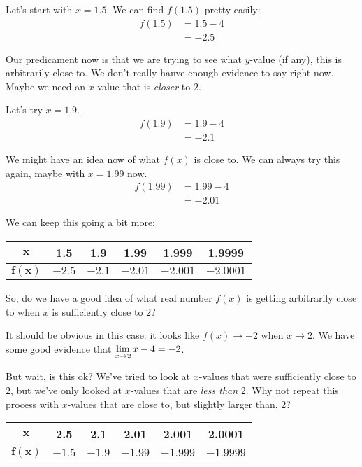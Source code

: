 Let's start with $x=1.5$.
We can find $f(1.5)$ pretty easily:
\begin{align*}
  f(1.5) & = 1.5-4\\
  & = -2.5
\end{align*}

Our predicament now is that we are trying to see what $y$-value (if any), this is arbitrarily close to.
We don't really hanve enough evidence to say right now.
Maybe we need an $x$-value that is \textit{closer} to $2$.

Let's try $x=1.9$.
\begin{align*}
  f(1.9) & = 1.9-4\\
  & = -2.1
\end{align*}

We might have an idea now of what $f(x)$ is close to.
We can always try this again, maybe with $x=1.99$ now.
\begin{align*}
  f(1.99) & = 1.99-4\\
  & = -2.01
\end{align*}

We can keep this going a bit more:

\begin{center}
  \begin{tabular}{cccccc} \toprule
    $\bm{x}$ & 1.5 & 1.9 & 1.99 & 1.999 & 1.9999\\ \midrule
    $\bm{f(x)}$ & $-2.5$ & $-2.1$ & $-2.01$ & $-2.001$ & $-2.0001$\\ \bottomrule
  \end{tabular}
\end{center}

So, do we have a good idea of what real number $f(x)$ is getting arbitrarily close to when $x$ is sufficiently close to $2$?

It should be obvious in this case: it looks like $f(x) \to -2$ when $x\to 2$.
We have some good evidence that $\displaystyle \lim_{x\to 2}x-4 = -2$.

But wait, is this ok? We've tried to look at $x$-values that were sufficiently close to $2$, but we've only looked at $x$-values that are \textit{less than} 2.
Why not repeat this process with $x$-values that are close to, but slightly larger than, 2?

\begin{center}
  \begin{tabular}{cccccc} \toprule
    $\bm{x}$ & 2.5 & 2.1 & 2.01 & 2.001 & 2.0001\\ \midrule
    $\bm{f(x)}$ & $-1.5$ & $-1.9$ & $-1.99$ & $-1.999$ & $-1.9999$\\ \bottomrule
  \end{tabular}
\end{center}

